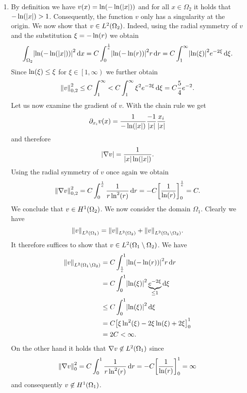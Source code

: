 \documentclass[english]{exercise}
\begin{document}
\begin{enumerate}
		\item By definition we have \(v\parentheses*{x} = \ln\parentheses*{-\ln\parentheses*{\absolute*{x}}}\) and for all \(x \in \Omega_2\) it holds that \(-\ln\parentheses*{\absolute*{x}} > 1\).
		Consequently, the function \(v\) only has a singularity at the origin.
		We now show that \(v \in L^2\parentheses*{\Omega_2}\).
		Indeed, using the radial symmetry of \(v\) and the substitution \(\xi = -\ln\parentheses*{r}\) we obtain
		\[
			\int_{\Omega_2}\absolute*{\ln\parentheses*{-\ln\parentheses*{\absolute*{x}}}}^2 \d x = C\int_0^{\frac{1}{e}}\absolute*{\ln\parentheses*{-\ln\parentheses*{r}}}^2 r\d r = C\int_1^\infty \absolute*{\ln\parentheses*{\xi}}^2 e^{-2\xi}\d\xi.
		\]
		Since \(\ln\parentheses*{\xi} \le \xi\) for \(\xi \in \left[1, \infty\right)\) we further obtain
		\[
			\norm*{v}_{0, 2}^2 \le C\int_1^\infty < C\int_1^\infty \xi^2 e^{-2\xi}\d\xi = C\frac{5}{4}e^{-2}.
		\]
		Let us now examine the gradient of \(v\).
		With the chain rule we get
		\[
			\partial_{x_i}v\parentheses*{x} = \frac{1}{-\ln\parentheses*{\absolute*{x}}}\frac{-1}{\absolute*{x}}\frac{x_i}{\absolute*{x}}
		\]
		and therefore
		\[
			\absolute*{\nabla v} = \frac{1}{\absolute*{x}\ln\parentheses*{\absolute*{x}}}.
		\]
		Using the radial symmetry of \(v\) once again we obtain
		\[
			\norm*{\nabla v}_{0, 2}^2 = C\int_0^{\frac{1}{e}}\frac{1}{r\ln^2\parentheses*{r}}\d r = -C\brackets*{\frac{1}{\ln\parentheses*{r}}}_0^{\frac{1}{e}} = C.
		\]
		We conclude that \(v \in H^1\parentheses*{\Omega_2}\).
		We now consider the domain \(\Omega_1\).
		Clearly we have
		\[
			\norm*{v}_{L^2\parentheses*{\Omega_1}} = \norm*{v}_{L^2\parentheses*{\Omega_2}} + \norm*{v}_{L^2\parentheses*{\Omega_1 \setminus \Omega_2}}.
		\]
		It therefore suffices to show that \(v \in L^2\parentheses*{\Omega_1 \setminus \Omega_2}\).
		We have
		\begin{align*}
			\norm*{v}_{L^2\parentheses*{\Omega_1 \setminus \Omega_2}} &= C\int_{\frac{1}{e}}^1 \absolute*{\ln\parentheses*{-\ln\parentheses*{r}}}^2 r\d r\\
			&= C\int_0^1 \absolute*{\ln\parentheses*{\xi}}^2 \underbrace{e^{-2\xi}}_{\le 1}\d\xi\\
			&\le C\int_0^1 \absolute*{\ln\parentheses*{\xi}}^2 \d\xi\\
			&= C\brackets*{\xi\ln^2\parentheses*{\xi} - 2\xi\ln\parentheses*{\xi} + 2\xi}_0^1\\
			&= 2C < \infty.
		\end{align*}
		On the other hand it holds that \(\nabla v \not\in L^2\parentheses*{\Omega_1}\) since
		\[
			\norm*{\nabla v}_0^2 = C\int_0^1 \frac{1}{r\ln^2\parentheses*{r}}\d r = -C\brackets*{\frac{1}{\ln\parentheses*{r}}}_0^1 = \infty
		\]
		and consequently \(v \not\in H^1\parentheses*{\Omega_1}\).
	\end{enumerate}
\end{document}
